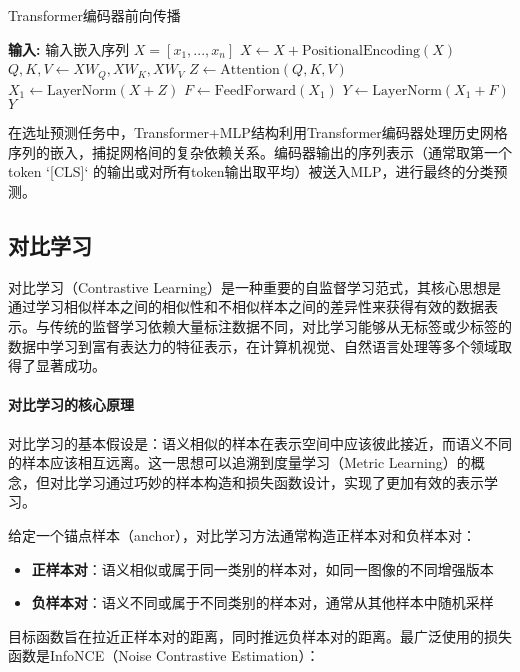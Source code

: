 \documentclass{article}
\begin{document}
\begin{algorithm}[H]
\caption{Transformer编码器前向传播}
\begin{algorithmic}[1]
\State \textbf{输入:} 输入嵌入序列 $X = [x_1, ..., x_n]$
\State $X \gets X + \text{PositionalEncoding}(X)$ 
\State {}
\State $Q, K, V \gets XW_Q, XW_K, XW_V$
\State $Z \gets \text{Attention}(Q, K, V)$
\State $X_1 \gets \text{LayerNorm}(X + Z)$ 
\State {}
\State $F \gets \text{FeedForward}(X_1)$
\State $Y \gets \text{LayerNorm}(X_1 + F)$ 
\State \Return $Y$
\end{algorithmic}
\end{algorithm}

在选址预测任务中，Transformer+MLP结构利用Transformer编码器处理历史网格序列的嵌入，捕捉网格间的复杂依赖关系。编码器输出的序列表示（通常取第一个token `[CLS]` 的输出或对所有token输出取平均）被送入MLP，进行最终的分类预测。



\subsection{对比学习}

对比学习（Contrastive Learning）是一种重要的自监督学习范式，其核心思想是通过学习相似样本之间的相似性和不相似样本之间的差异性来获得有效的数据表示\cite{chen_simple_2020}。与传统的监督学习依赖大量标注数据不同，对比学习能够从无标签或少标签的数据中学习到富有表达力的特征表示，在计算机视觉、自然语言处理等多个领域取得了显著成功。

\paragraph{对比学习的核心原理}
对比学习的基本假设是：语义相似的样本在表示空间中应该彼此接近，而语义不同的样本应该相互远离。这一思想可以追溯到度量学习（Metric Learning）的概念，但对比学习通过巧妙的样本构造和损失函数设计，实现了更加有效的表示学习。

给定一个锚点样本（anchor），对比学习方法通常构造正样本对和负样本对：
\begin{itemize}
\item \textbf{正样本对}：语义相似或属于同一类别的样本对，如同一图像的不同增强版本
\item \textbf{负样本对}：语义不同或属于不同类别的样本对，通常从其他样本中随机采样
\end{itemize}

目标函数旨在拉近正样本对的距离，同时推远负样本对的距离。最广泛使用的损失函数是InfoNCE（Noise Contrastive Estimation）\cite{oord_representation_2018}：
\end{document}
